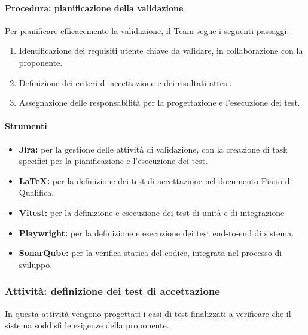 \documentclass[a4paper,12pt]{article}
\begin{document}
\paragraph{Procedura: pianificazione della validazione}
Per pianificare efficacemente la validazione, il Team segue i seguenti
passaggi:
\begin{enumerate}
    \item Identificazione dei requisiti utente chiave da validare, in collaborazione con la proponente.
    \item Definizione dei criteri di accettazione e dei risultati attesi.
    \item Assegnazione delle responsabilità per la progettazione e l'esecuzione dei test.
\end{enumerate}

\paragraph{Strumenti}
\begin{itemize}
    \item \textbf{Jira:} per la gestione delle attività di validazione, con la creazione di task specifici per la pianificazione e l'esecuzione dei test.
    \item \textbf{\LaTeX:} per la definizione dei test di accettazione nel documento Piano di Qualifica.
    \item \textbf{Vitest:} per la definizione e esecuzione dei test di unità e di integrazione
    \item \textbf{Playwright:} per la definizione e esecuzione dei test end-to-end di sistema.
    \item \textbf{SonarQube:} per la verifica statica del codice, integrata nel processo di sviluppo.
\end{itemize}

\subsubsection{Attività: definizione dei test di accettazione}
In questa attività vengono progettati i casi di test finalizzati a verificare
che il sistema soddisfi le esigenze della proponente.
\end{document}
